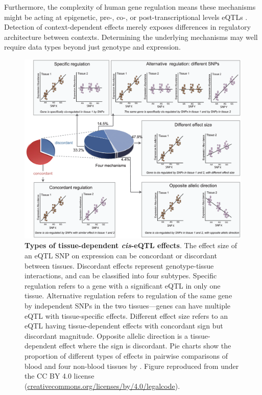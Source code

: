 \begin{outline}
Furthermore, the complexity of human gene regulation means these mechanisms might be acting at epigenetic, pre-, co-, or post-transcriptional levels \glspl{eQTL} \autocite{gaffney2013GlobalPropertiesFunctional}.
Detection of context-dependent effects merely exposes differences in regulatory architecture between contexts.
Determining the underlying mechanisms may well require data types beyond just genotype and expression.

\begin{figure}
    \centering
    \includegraphics[width=1.0\textwidth,page=1]{mainmatter/figures/chapter_01/fu2012UnravelingRegulatoryMechanisms/journal.pgen.1002431.g002.png}
    \caption{
        \textbf{Types of tissue-dependent \textit{cis}-\gls{eQTL} effects}.
        The effect size of an \gls{eQTL} \gls{SNP} on expression can be concordant or discordant between tissues.
        Discordant effects represent genotype-tissue interactions, and can be classified into four subtypes.
        Specific regulation refers to a gene with a significant \gls{eQTL} in only one tissue.
        Alternative regulation refers to regulation of the same gene by independent \glspl{SNP} in the two tissues---genes can have multiple \gls{eQTL} with tissue-specific effects.
        Different effect size refers to an \gls{eQTL} having tissue-dependent effects with concordant sign but discordant magnitude.
        Opposite allelic direction is a tissue-dependent effect where the sign is discordant.
        Pie charts show the proportion of different types of effects in pairwise comparisons of blood and four non-blood tissues by \textcite{fu2012UnravelingRegulatoryMechanisms}.
        Figure reproduced from \textcite{fu2012UnravelingRegulatoryMechanisms} under the CC BY 4.0 license (\url{creativecommons.org/licenses/by/4.0/legalcode}).
    }
    \label{fig:intro_reQTLtypes}
\end{figure}


\end{outline}
